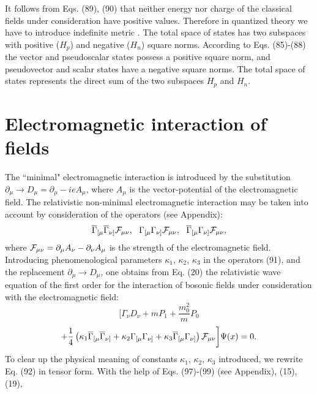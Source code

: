 \documentclass[a4paper,12pt]{article}
\begin{document}
It follows from Eqs. (89), (90) that neither energy nor charge of
the classical fields under consideration have positive values.
Therefore in quantized theory we have to introduce indefinite
metric \cite{monogr}. The total space of states has two subspaces
with positive ($H_p$) and negative ($H_n$) square norms. According
to Eqs. (85)-(88) the vector and pseudoscalar states possess a
positive square norm, and pseudovector and scalar states have a
negative square norms. The total space of states represents the
direct sum of the two subspaces $H_p$ and $H_n$.

\section{Electromagnetic interaction of fields}

The ``minimal" electromagnetic interaction is introduced by the
substitution $\partial_\mu \rightarrow D_\mu=\partial_\mu -ieA_\mu
$, where $A_\mu $ is the vector-potential of the electromagnetic
field. The relativistic non-minimal electromagnetic interaction
may be taken into account by consideration of the operators (see
Appendix):
\begin{equation}
\overline{\Gamma}_{[\mu}\overline{\Gamma}_{\nu]}{\cal F}_{\mu\nu}
,~~ \Gamma_{[\mu}\Gamma_{\nu]}{\cal F}_{\mu\nu}
,~~\overline{\Gamma}_{[\mu}\Gamma_{\nu]}{\cal F}_{\mu\nu} ,
\label{91}
\end{equation}
where ${\cal F}_{\mu\nu}=\partial_\mu A_\nu -\partial_\nu A_\mu $
is the strength of the electromagnetic field. Introducing
phenomenological parameters $\kappa_1$, $\kappa_2$, $\kappa_3$ in
the operators (91), and the replacement $\partial_\mu \rightarrow
D_\mu$, one obtains from Eq. (20) the relativistic wave equation
of the first order for the interaction of bosonic fields under
consideration with the electromagnetic field:
\[
\biggl [ \Gamma _\nu D _\nu +mP_1+\frac{m_0^2}{m}P_0
\]
\vspace{-8mm}
\begin{equation}
\label{92}
\end{equation}
\vspace{-8mm}
\[
+\frac{1}{4}\left(\kappa_1\overline{\Gamma}_{[\mu}
\overline{\Gamma}_{\nu]} +\kappa_2\Gamma_{[\mu}\Gamma_{\nu]}
+\kappa_3\overline{\Gamma}_{[\mu}\Gamma_{\nu]} \right){\cal
F}_{\mu\nu}\biggr] \Psi (x)=0 . \label{20}
\]
To clear up the physical meaning of constants $\kappa_1$,
$\kappa_2$, $\kappa_3$ introduced, we rewrite Eq. (92) in tensor
form. With the help of Eqs. (97)-(99) (see Appendix), (15), (19),
\end{document}
